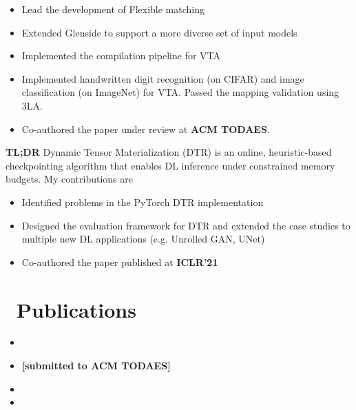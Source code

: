 \documentclass{resume}
\begin{document}
\begin{itemize}
    \item Lead the development of Flexible matching
    \item Extended Glenside to support a more diverse set of input models
    \item Implemented the compilation pipeline for VTA
    \item Implemented handwritten digit recognition (on CIFAR) and image classification (on ImageNet) for VTA. Passed the mapping validation using 3LA.
    \item Co-authored the paper under review at \textbf{ACM TODAES}.
\end{itemize}
\textbf{TL;DR} Dynamic Tensor Materialization (DTR) is an online, heuristic-based checkpointing algorithm that enables DL inference under constrained memory budgets. My contributions are
\begin{itemize} 
    \item Identified problems in the PyTorch DTR implementation
    \item Designed the evaluation framework for DTR and extended the case studies to multiple new DL applications (e.g. Unrolled GAN, UNet)
    \item Co-authored the paper published at \textbf{ICLR'21}
\end{itemize}

\section{\faLeanpub\ Publications}
\begin{itemize}
    \item {}
    \item \textbf{[submitted to ACM TODAES]}
    \item {}
    \item {}
\end{itemize}
\end{document}
